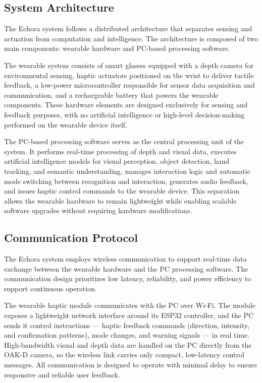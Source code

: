\subsection{System Architecture}
\label{subsubsec:system_architecture}

The Echora system follows a distributed architecture that separates sensing and actuation from computation and intelligence. The architecture is composed of two main components: wearable hardware and PC-based processing software.

The wearable system consists of smart glasses equipped with a depth camera for environmental sensing, haptic actuators positioned on the wrist to deliver tactile feedback, a low-power microcontroller responsible for sensor data acquisition and communication, and a rechargeable battery that powers the wearable components. These hardware elements are designed exclusively for sensing and feedback purposes, with no artificial intelligence or high-level decision-making performed on the wearable device itself.

The PC-based processing software serves as the central processing unit of the system. It performs real-time processing of depth and visual data, executes artificial intelligence models for visual perception, object detection, hand tracking, and semantic understanding, manages interaction logic and automatic mode switching between recognition and interaction, generates audio feedback, and issues haptic control commands to the wearable device. This separation allows the wearable hardware to remain lightweight while enabling scalable software upgrades without requiring hardware modifications.

\subsection{Communication Protocol}
\label{subsubsec:communication_protocol}

The Echora system employs wireless communication to support real-time data exchange between the wearable hardware and the PC processing software. The communication design prioritizes low latency, reliability, and power efficiency to support continuous operation.

The wearable haptic module communicates with the PC over Wi-Fi. The module exposes a lightweight network interface around its ESP32 controller, and the PC sends it control instructions --- haptic feedback commands (direction, intensity, and confirmation patterns), mode changes, and warning signals --- in real time. High-bandwidth visual and depth data are handled on the PC directly from the OAK-D camera, so the wireless link carries only compact, low-latency control messages. All communication is designed to operate with minimal delay to ensure responsive and reliable user feedback.


